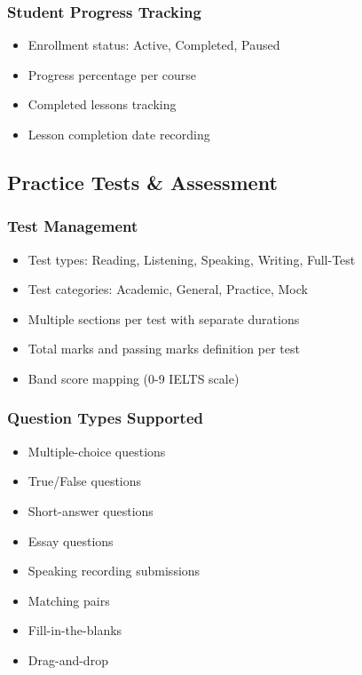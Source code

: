 \documentclass{article}
\begin{document}
\subsubsection{Student Progress Tracking}
\begin{itemize}
    \item Enrollment status: Active, Completed, Paused
    \item Progress percentage per course
    \item Completed lessons tracking
    \item Lesson completion date recording
\end{itemize}

\subsection{Practice Tests \& Assessment}

\subsubsection{Test Management}
\begin{itemize}
    \item Test types: Reading, Listening, Speaking, Writing, Full-Test
    \item Test categories: Academic, General, Practice, Mock
    \item Multiple sections per test with separate durations
    \item Total marks and passing marks definition per test
    \item Band score mapping (0-9 IELTS scale)
\end{itemize}

\subsubsection{Question Types Supported}
\begin{itemize}
    \item Multiple-choice questions
    \item True/False questions
    \item Short-answer questions
    \item Essay questions
    \item Speaking recording submissions
    \item Matching pairs
    \item Fill-in-the-blanks
    \item Drag-and-drop
\end{itemize}
\end{document}
